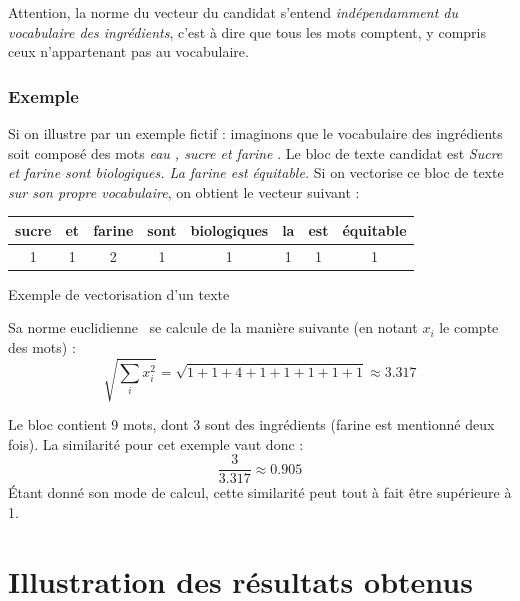                 Attention, la norme du vecteur du candidat s'entend \emph{indépendamment du vocabulaire des ingrédients}, c'est à dire que tous les mots comptent, y compris ceux n'appartenant pas au vocabulaire.

                \subsubsection{Exemple}
                Si on illustre par un exemple fictif : imaginons que le vocabulaire des ingrédients soit composé des mots \emph{\og eau \fg, \og sucre \fg et \og farine \fg}.
                Le bloc de texte candidat est \emph{\og Sucre et farine sont biologiques. La farine est équitable.\fg}
                Si on vectorise ce bloc de texte \emph{sur son propre vocabulaire}, on obtient le vecteur suivant : 

                \bigskip
                \begin{minipage}{\textwidth}
                \captionsetup{type=table}
                \centering
                \begin{tabular}{cccccccc}
                    \toprule
                    sucre & et & farine & sont & biologiques & la & est & équitable \\
                    \midrule
                    1 & 1 & 2 & 1 & 1 & 1 & 1 & 1 \\
                    \bottomrule
                \end{tabular}
                \caption{Exemple de vectorisation d'un texte}
                \bigskip
                \end{minipage}                

                Sa norme euclidienne~\cite{norm_wiki} se calcule de la manière suivante (en notant $x_{i}$ le compte des mots) : 
                \[\sqrt{\sum_{i}^{} x_{i}^{2}} = \sqrt{1 + 1 + 4 + 1 + 1 + 1 + 1 + 1} \approx 3.317\]

                Le bloc contient 9 mots, dont 3 sont des ingrédients (\og farine \fg est mentionné deux fois). La similarité pour cet exemple vaut donc :
                \[\frac{3}{3.317} \approx 0.905\]
                \'{E}tant donné son mode de calcul, cette similarité peut tout à fait être supérieure à 1.

        \section{Illustration des résultats obtenus}
    

